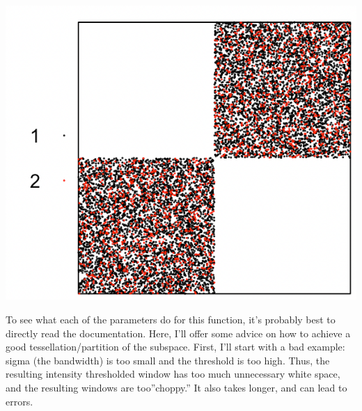 \documentclass[
]{book}
\newenvironment{Shaded}{\begin{snugshade}}{\end{snugshade}}
\newcommand{\AttributeTok}[1]{\textcolor[rgb]{0.77,0.63,0.00}{#1}}
\newcommand{\DecValTok}[1]{\textcolor[rgb]{0.00,0.00,0.81}{#1}}
\newcommand{\FunctionTok}[1]{\textcolor[rgb]{0.00,0.00,0.00}{#1}}
\newcommand{\NormalTok}[1]{#1}
\newcommand{\OtherTok}[1]{\textcolor[rgb]{0.56,0.35,0.01}{#1}}
\newcommand{\SpecialCharTok}[1]{\textcolor[rgb]{0.00,0.00,0.00}{#1}}
\begin{document}
\includegraphics[width=8.17in]{Figures/Package Figs/Simulated_Data}

To see what each of the parameters do for this function, it's probably best to directly read the documentation. Here, I'll offer some advice on how to achieve a good tessellation/partition of the subspace. First, I'll start with a bad example: sigma (the bandwidth) is too small and the threshold is too high. Thus, the resulting intensity thresholded window has too much unnecessary white space, and the resulting windows are too''choppy.'' It also takes longer, and can lead to errors.

\begin{Shaded}
\end{Shaded}
\end{document}

